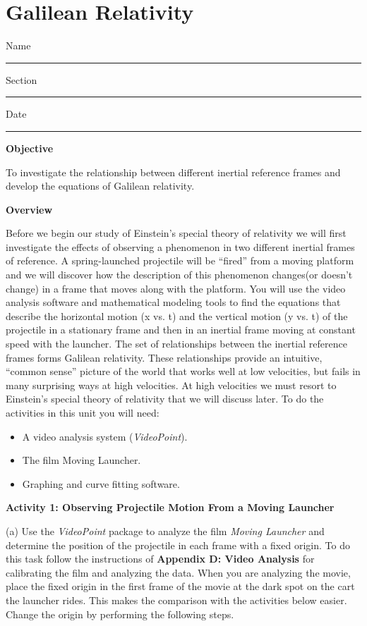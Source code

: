
\section{Galilean Relativity}

Name \rule{2.0in}{0.1pt}\hfill{}Section \rule{1.0in}{0.1pt}\hfill{}Date
\rule{1.0in}{0.1pt}

\textbf{Objective }

To investigate the relationship between different inertial reference
frames and develop the equations of Galilean relativity.

\textbf{Overview}

Before we begin our study of Einstein's special theory of relativity
we will first investigate the effects of observing a phenomenon in
two different inertial frames of reference. A spring-launched projectile
will be {}``fired'' from a moving platform and we will discover
how the description of this phenomenon changes(or doesn't change)
in a frame that moves along with the platform. You will use the video
analysis software and mathematical modeling tools to find the equations
that describe the horizontal motion (x vs. t) and the vertical motion
(y vs. t) of the projectile in a stationary frame and then in an inertial
frame moving at constant speed with the launcher. The set of relationships
between the inertial reference frames forms Galilean relativity. These
relationships provide an intuitive, {}``common sense'' picture of
the world that works well at low velocities, but fails in many surprising
ways at high velocities. At high velocities we must resort to Einstein's
special theory of relativity that we will discuss later. To do the
activities in this unit you will need:

\begin{itemize}
\item A video analysis system (\emph{VideoPoint}).
\item The film Moving Launcher.
\item Graphing and curve fitting software.
\end{itemize}
\textbf{Activity 1: Observing Projectile Motion From a Moving Launcher}

(a) Use the \emph{VideoPoint} package to analyze the film \emph{Moving
Launcher} and determine the position of the projectile in each frame
with a fixed origin. To do this task follow the instructions of \textbf{Appendix
D: Video Analysis} for calibrating the film and analyzing the data.
When you are analyzing the movie, place the fixed origin in the first
frame of the movie at the dark spot on the cart the launcher rides.
This makes the comparison with the activities below easier. Change
the origin by performing the following steps.

